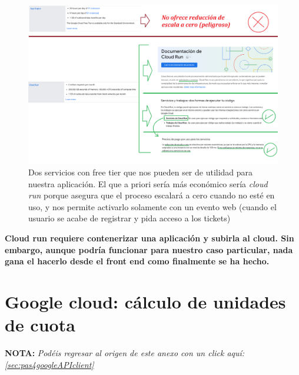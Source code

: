 \documentclass[a4paper,12pt]{report}
\begin{document}
		\FloatBarrier
		\begin{figure}[H]
			\centering
			\caption{Dos servicios con free tier que nos pueden ser de utilidad para nuestra aplicación. El que a priori sería más económico sería \textit{cloud run} porque asegura que el proceso escalará a cero cuando no esté en uso, y nos permite activarlo solamente con un evento web (cuando el usuario se acabe de registrar y pida acceso a los tickets)}
			\label{fig:googleCloud2}
			\includegraphics[width=1\linewidth]{img/googleCloud2.png}
		\end{figure}
		\FloatBarrier
		
	\textbf{Cloud run requiere contenerizar una aplicación y subirla al cloud. Sin embargo, aunque podría funcionar para nuestro caso particular, nada gana el hacerlo desde el front end como finalmente se ha hecho.}
		
	\section{Google cloud: cálculo de unidades de cuota}
	\label{sec:googleQuotas}
	
	\noindent \textbf{NOTA:} \textit{Podéis regresar al origen de este anexo con un click aquí: \ref{sec:pas4googleAPIclient}} \\
	
	
	
\end{document}
